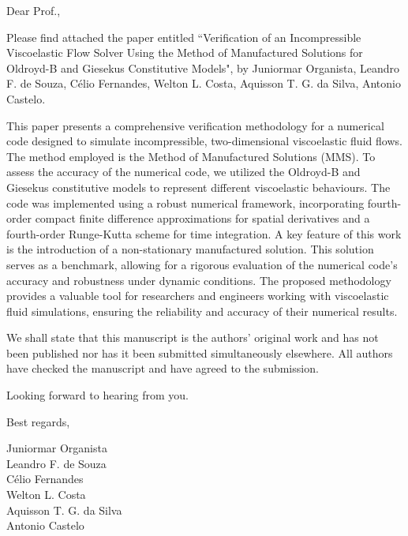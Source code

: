 \documentclass{letter}
\begin{document}
Dear Prof.,

Please find attached the paper entitled ``Verification of an Incompressible Viscoelastic Flow Solver Using the Method of Manufactured Solutions for Oldroyd-B and Giesekus Constitutive Models", by Juniormar Organista, Leandro F. de Souza, C\'elio Fernandes, Welton L. Costa, Aquisson T. G. da Silva, Antonio Castelo. 

This paper presents a comprehensive verification methodology for a numerical code designed to simulate incompressible, two-dimensional viscoelastic fluid flows. The method employed is the Method of Manufactured Solutions (MMS). To assess the accuracy of the numerical code, we utilized the Oldroyd-B and Giesekus constitutive models to represent different viscoelastic behaviours. The code was implemented using a robust numerical framework, incorporating fourth-order compact finite difference approximations for spatial derivatives and a fourth-order Runge-Kutta scheme for time integration. A key feature of this work is the introduction of a non-stationary manufactured solution. This solution serves as a benchmark, allowing for a rigorous evaluation of the numerical code's accuracy and robustness under dynamic conditions. The proposed methodology provides a valuable tool for researchers and engineers working with viscoelastic fluid simulations, ensuring the reliability and accuracy of their numerical results. 

We shall state that this manuscript is the authors' original work and has not been published nor has it been submitted simultaneously elsewhere. All authors have checked the manuscript and have agreed to the submission.

Looking forward to hearing from you.

Best regards,

Juniormar Organista\\
Leandro F. de Souza\\
C\'elio Fernandes\\
Welton L. Costa\\
Aquisson T. G. da Silva\\
Antonio Castelo
\end{document}
